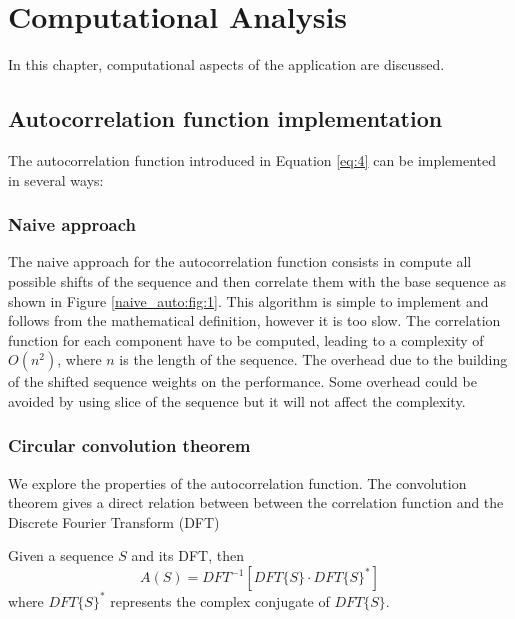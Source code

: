 \chapter{ Computational Analysis}

In this chapter,  computational aspects of the application are discussed.


  \section{ Autocorrelation function implementation}
    The autocorrelation function introduced in Equation \eqref{eq:4} can be
    implemented in several ways:

      \subsection{Naive approach}
        The naive approach for the autocorrelation function consists in
        compute all possible shifts of the sequence and then
        correlate them with the base sequence as shown in Figure
        \ref{naive_auto:fig:1}.  This algorithm is simple to implement and
        follows from the mathematical definition, however it is too slow. The
        correlation function for each component have to be computed, leading to a
        complexity of $O(n^{2})$, where $n$ is the length of the sequence. The
        overhead due to the building of  the shifted sequence weights on the
        performance. Some overhead could be avoided by using slice of the sequence
        but it will not affect the complexity.\\

      \subsection{Circular convolution theorem}\label{section:impl:convolution}
      We explore the properties of the autocorrelation function. The convolution theorem\cite{golomb_ref} gives a  direct relation between between the correlation function and the Discrete Fourier Transform (DFT)\\
      \begin{theorem}
          Given a sequence $S$ and its DFT, then
          \begin{equation}
            A(S) = DFT^{-1}[DFT\{S\} · DFT\{S\}^{*}]
          \end{equation}
          where $DFT\{S\}^{*}$ represents the complex conjugate of $DFT\{S\}$.
        \end{theorem}

